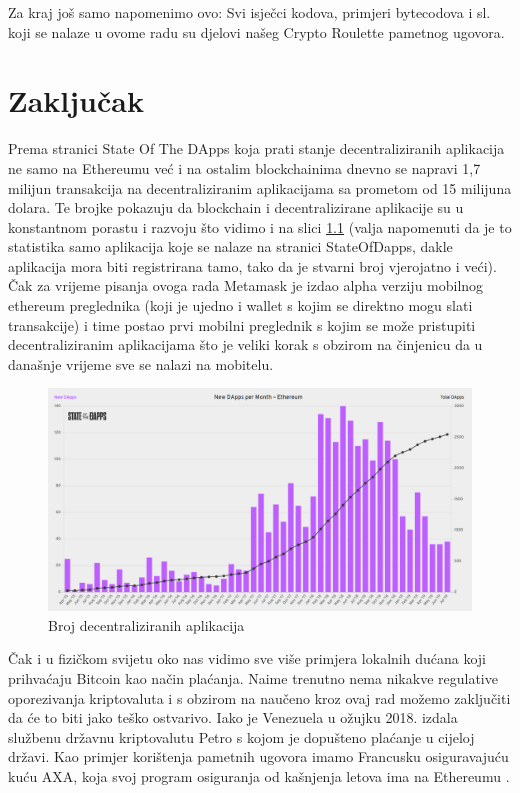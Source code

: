 \documentclass[a4paper,oneside,12pt]{memoir} %
\begin{document}
Za kraj još samo napomenimo ovo: Svi isječci kodova, primjeri bytecodova i sl. koji se nalaze u ovome radu su djelovi našeg Crypto Roulette pametnog ugovora.

\chapter{Zaključak}

Prema stranici State Of The DApps koja prati stanje decentraliziranih aplikacija ne samo na Ethereumu već i na ostalim blockchainima dnevno se napravi 1,7 milijun transakcija na decentraliziranim aplikacijama sa prometom od 15 milijuna dolara. Te brojke pokazuju da blockchain i decentralizirane aplikacije su u konstantnom porastu i razvoju što vidimo i na slici \ref{fig:stats} (valja napomenuti da je to statistika samo aplikacija koje se nalaze na stranici StateOfDapps, dakle aplikacija mora biti registrirana tamo, tako da je stvarni broj vjerojatno i veći). Čak za vrijeme pisanja ovoga rada Metamask je izdao alpha verziju mobilnog ethereum preglednika (koji je ujedno i wallet s kojim se direktno mogu slati transakcije) i time postao prvi mobilni preglednik s kojim se može pristupiti decentraliziranim aplikacijama što je veliki korak s obzirom na činjenicu da u današnje vrijeme sve se nalazi na mobitelu.

\begin{figure}[H]
\centering
\includegraphics[scale=0.37]{dapps_stats}
\caption{Broj decentraliziranih aplikacija}
\label{fig:stats}
\end{figure}

\newpage

Čak i u fizičkom svijetu oko nas vidimo sve više primjera lokalnih dućana koji prihvaćaju Bitcoin kao način plaćanja. Naime trenutno nema nikakve regulative oporezivanja kriptovaluta i s obzirom na naučeno kroz ovaj rad možemo zaključiti da će to biti jako teško ostvarivo. Iako je Venezuela u ožujku 2018. izdala službenu državnu kriptovalutu Petro s kojom je dopušteno plaćanje u cijeloj državi. Kao primjer korištenja pametnih ugovora imamo Francusku osiguravajuću kuću AXA, koja svoj program osiguranja od kašnjenja letova ima na Ethereumu \cite{axa}.
\end{document}
